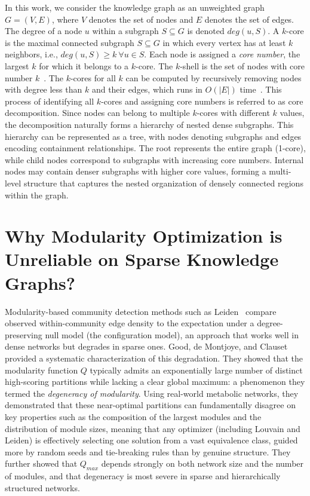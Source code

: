 \documentclass[sigconf]{acmart}
\begin{document}
In this work, we consider the knowledge graph as an unweighted graph $G = (V, E)$, where $V$ denotes the set of nodes and $E$ denotes the set of edges.
The degree of a node $u$ within a subgraph $S \subseteq G$ is denoted $deg(u, S)$.
A $k$-core is the maximal connected subgraph $S \subseteq G$ in which every vertex has at least $k$ neighbors, i.e., $deg(u, S) \ge k~\forall u \in S$. Each node is assigned a \textit{core number}, the largest $k$ for which it belongs to a $k$-core. The $k$-shell is the set of nodes with core number $k$~\cite{carmi07}. The $k$-cores for all $k$ can be computed by recursively removing nodes with degree less than $k$ and their edges, which runs in $O(|E|)$ time~\cite{batagelj11}. 
This process of identifying all $k$-cores and assigning core numbers is referred to as core decomposition.
Since nodes can belong to multiple $k$-cores with different $k$ values, the decomposition naturally forms a hierarchy of nested dense subgraphs.  
This hierarchy can be represented as a tree, with nodes denoting subgraphs and edges encoding containment relationships.
The root represents the entire graph (1-core), while child nodes correspond to subgraphs with increasing core numbers.
Internal nodes may contain denser subgraphs with higher core values, forming a multi-level structure that captures the nested organization of densely connected regions within the graph.



\section{Why Modularity Optimization is Unreliable on Sparse Knowledge Graphs?}

Modularity-based community detection methods such as Leiden~\cite{traag19} compare observed within-community edge density to the expectation under a degree-preserving null model (the configuration model), an approach that works well in dense networks but degrades in sparse ones. Good, de Montjoye, and Clauset~\cite{good2010performance} provided a systematic characterization of this degradation. They showed that the modularity function ${Q}$ typically admits an exponentially large number of distinct high-scoring partitions while lacking a clear global maximum: a phenomenon they termed the \emph{degeneracy of modularity}. Using real-world metabolic networks, they demonstrated that these near-optimal partitions can fundamentally disagree on key properties such as the composition of the largest modules and the distribution of module sizes, meaning that any optimizer (including Louvain and Leiden) is effectively selecting one solution from a vast equivalence class, guided more by random seeds and tie-breaking rules than by genuine structure. They further showed that $Q_{max}$
 depends strongly on both network size and the number of modules, and that degeneracy is most severe in sparse and hierarchically structured networks.
\end{document}
